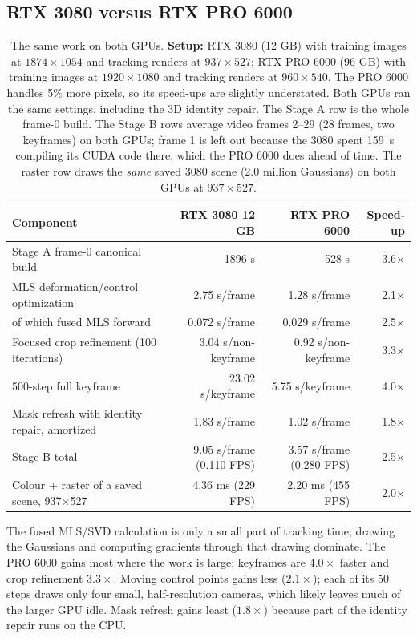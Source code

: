 \documentclass[11pt]{article}
\begin{document}
\subsection{RTX 3080 versus RTX PRO 6000}
\begin{table}[!htbp]\centering
\caption{The same work on both GPUs. \textbf{Setup:}
RTX 3080 (12 GB) with training images at $1874\times1054$ and tracking renders at $937\times527$;
RTX PRO 6000 (96 GB) with training images at $1920\times1080$ and tracking renders at $960\times540$.
The PRO 6000 handles 5\% more pixels, so its speed-ups are slightly understated. Both GPUs ran the
same settings, including the 3D identity repair. The Stage A row is the whole frame-0 build. The
Stage B rows average video frames 2--29 (28 frames, two keyframes) on both GPUs; frame 1 is left out
because the 3080 spent 159~s compiling its CUDA code there, which the PRO 6000 does ahead of time.
The raster row draws the \emph{same} saved 3080 scene (2.0 million Gaussians) on both GPUs at
$937\times527$.}\label{tab:runtime}
\small\begin{tabular}{lrrr}\toprule
Component & RTX 3080 12 GB & RTX PRO 6000 & Speed-up \\\midrule
Stage A frame-0 canonical build & 1896 s & 528 s & 3.6$\times$ \\
MLS deformation/control optimization & 2.75 s/frame & 1.28 s/frame & 2.1$\times$ \\
\quad of which fused MLS forward & 0.072 s/frame & 0.029 s/frame & 2.5$\times$ \\
Focused crop refinement (100 iterations) & 3.04 s/non-keyframe & 0.92 s/non-keyframe & 3.3$\times$ \\
500-step full keyframe & 23.02 s/keyframe & 5.75 s/keyframe & 4.0$\times$ \\
Mask refresh with identity repair, amortized & 1.83 s/frame & 1.02 s/frame & 1.8$\times$ \\
Stage B total & 9.05 s/frame (0.110 FPS) & 3.57 s/frame (0.280 FPS) & 2.5$\times$ \\
Colour + raster of a saved scene, 937$\times$527 & 4.36 ms (229 FPS) & 2.20 ms (455 FPS) & 2.0$\times$ \\\bottomrule
\end{tabular}\end{table}

The fused MLS/SVD calculation is only a small part of tracking time; drawing the Gaussians and
computing gradients through that drawing dominate. The PRO 6000 gains most where the work is large:
keyframes are $4.0\times$ faster and crop refinement $3.3\times$. Moving control points gains less
($2.1\times$); each of its 50 steps draws only four small, half-resolution cameras, which likely
leaves much of the larger GPU idle. Mask refresh gains least ($1.8\times$) because part of the
identity repair runs on the CPU.
\end{document}
